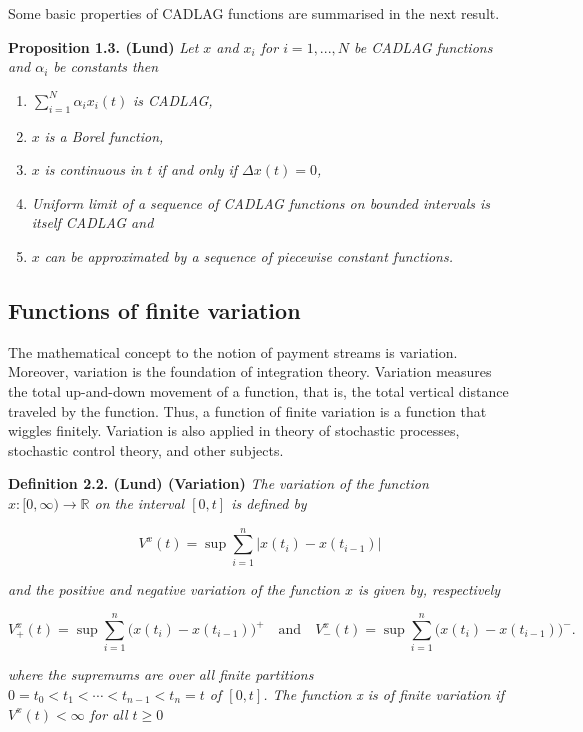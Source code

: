 \documentclass[a4paper,10pt,openany]{book}
\providecommand{\tightlist}{%
 \setlength{\itemsep}{0pt}\setlength{\parskip}{0pt}}
\begin{document}
Some basic properties of CADLAG functions are summarised in the next result.

\textbf{Proposition 1.3. (Lund)} \emph{Let \(x\) and \(x_i\) for \(i=1,...,N\) be CADLAG functions and \(\alpha_i\) be constants then}

\begin{enumerate}
\def\labelenumi{\roman{enumi})}
\tightlist
\item
  \(\sum_{i=1}^N \alpha_ix_i(t)\) \emph{is CADLAG,}
\item
  \(x\) \emph{is a Borel function,}
\item
  \(x\) \emph{is continuous in \(t\) if and only if \(\Delta x(t)=0\),}
\item
  \emph{Uniform limit of a sequence of CADLAG functions on bounded intervals is itself CADLAG and}
\item
  \(x\) \emph{can be approximated by a sequence of piecewise constant functions.}
\end{enumerate}

\hypertarget{functions-of-finite-variation}{%
\subsection{Functions of finite variation}\label{functions-of-finite-variation}}

The mathematical concept to the notion of payment streams is variation. Moreover, variation is the foundation of integration theory. Variation measures the total up-and-down movement of a function, that is, the total vertical distance traveled by the function. Thus, a function of finite variation is a function that wiggles finitely. Variation is also applied in theory of stochastic processes, stochastic control theory, and other subjects.

\textbf{Definition 2.2. (Lund) (Variation)} \emph{The variation of the function \(x : [0, \infty) \to\mathbb R\) on the interval \([0, t]\) is defined by}

\[
V^x(t)=\sup\sum_{i=1}^n\vert x(t_i)-x(t_{i-1})\vert
\]

\emph{and the positive and negative variation of the function \(x\) is given by, respectively}

\[
V^x_+(t)=\sup\sum_{i=1}^n\big( x(t_i)-x(t_{i-1})\big)^+\quad \text{and}\quad V^x_-(t)=\sup\sum_{i=1}^n\big( x(t_i)-x(t_{i-1})\big)^-.
\]

\emph{where the supremums are over all finite partitions \(0 = t_0<t_1<\cdots<t_{n-1}<t_n=t\) of \([0,t]\). The function x is of finite variation if \(V^x(t)<\infty\) for all \(t\ge 0\)}
\end{document}
